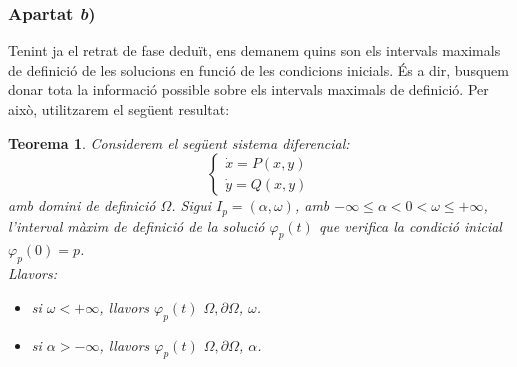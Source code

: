 \documentclass[10pt,a4paper]{article}
\newtheorem{thm}{Teorema}
\begin{document}
\subsubsection*{Apartat \emph{b})}
Tenint ja el retrat de fase deduït, ens demanem quins son els intervals maximals de definició de les solucions en funció de les condicions inicials. És a dir, busquem donar tota la informació possible sobre els intervals maximals de definició. Per això, utilitzarem el següent resultat:

\begin{thm}
  Considerem el següent sistema diferencial: \begin{equation}
    \begin{cases}
      \dot{x}=P(x,y) \\
      \dot{y}=Q(x,y)
    \end{cases}
  \end{equation}
  amb domini de definició $\Omega$. Sigui $I_p=(\alpha, \omega)$, amb $-\infty\leq \alpha <0< \omega\leq +\infty$, l'interval màxim de definició de la solució $\varphi_p(t)$ que verifica la condició inicial $\varphi_p(0)=p$.
  \\
  Llavors: \begin{itemize}
    \item	si $\omega<+\infty$, llavors $\varphi_p(t)$  $\Omega, \partial \Omega$,  $\omega$.
    \item si $\alpha>-\infty$, llavors $\varphi_p(t)$  $\Omega, \partial \Omega$,  $\alpha$.
  \end{itemize}
\end{thm}
\end{document}
